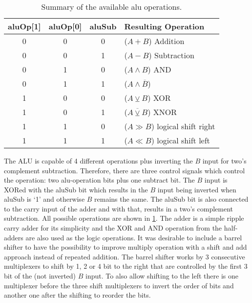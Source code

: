\subsubsection{}
\begin{table}
  \centering
  \renewcommand{\arraystretch}{1.25}
  \caption{Summary of the available alu operations.}
  \label{tab:aluOp}
  \begin{tabularx}{.8\textwidth}{ |c|c|c||X| }
    \hline
    aluOp[1] & aluOp[0] & aluSub & Resulting Operation\\\hline\hline
    0 & 0 & 0 & ($A + B$) Addition \\\hline
    0 & 0 & 1 & ($A - B$) Subtraction \\\hline
    0 & 1 & 0 & ($A \land B$) AND \\\hline
    0 & 1 & 1 & ($A \land \overline{B}$) \\\hline
    1 & 0 & 0 & ($A \veebar B$) XOR \\\hline
    1 & 0 & 1 & ($\overline{A \veebar B}$) XNOR \\\hline
    1 & 1 & 0 & ($A \gg B$) logical shift right \\\hline
    1 & 1 & 1 & ($A \ll B$) logical shift left \\\hline
  \end{tabularx}
\end{table}
The \gls{ALU} is capable of 4 different operations plus inverting the $B$ input for two's complement subtraction.
Therefore, there are three control signals which control the operation: two alu-operation bits plus one subtract bit.
The $B$ input is XORed with the aluSub bit which results in the $B$ input being inverted when aluSub is `1' and otherwise $B$ remains the same.
The aluSub bit is also connected to the carry input of the adder and with that, results in a two's complement subtraction.
All possible operations are shown in \cref{tab:aluOp}.
The adder is a simple ripple carry adder for its simplicity and the XOR and AND operation from the half-adders are also used as the logic operations.
It was desirable to include a barrel shifter to have the possibility to improve multiply operation with a shift and add approach instead of repeated addition.
The barrel shifter works by 3 consecutive multiplexers to shift by 1, 2 or 4 bit to the right that are controlled by the first 3 bit of the (not inverted) $B$ input.
To also allow shifting to the left there is one multiplexer before the three shift multiplexers to invert the order of bits and another one after the shifting to reorder the bits.

